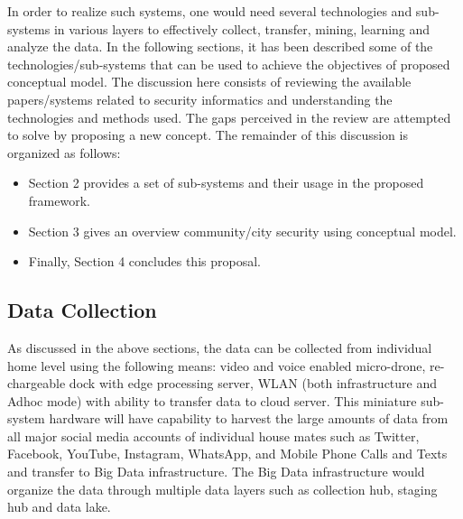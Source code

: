 \documentclass[sigconf]{acmart}
\begin{document}
In order to realize such systems, one would need several technologies and sub-systems in various layers to effectively collect, transfer, mining, learning and analyze the data. In the following sections, it has been described some of the technologies/sub-systems that can be used to achieve the objectives of proposed conceptual model.
The discussion here consists of reviewing the available papers/systems related to security informatics and understanding the technologies and methods used. The gaps perceived in the review are attempted to solve by proposing a new concept. The remainder of this discussion is organized as follows:
\begin{itemize}
  \item Section 2 provides a set of sub-systems and their usage in the proposed framework. 
  \item Section 3 gives an overview community/city security using conceptual model. 
  \item Finally, Section 4 concludes this proposal.
\end{itemize}

\subsection{Data Collection}
As discussed in the above sections, the data can be collected from individual home level using the following means: video and voice enabled micro-drone, re-chargeable dock with edge processing server, WLAN (both infrastructure and Adhoc mode) with ability to transfer data to cloud server. This miniature sub-system hardware will have capability to harvest the large amounts of data from all major social media accounts of individual house mates such as Twitter, Facebook, YouTube, Instagram, WhatsApp, and Mobile Phone Calls and Texts and transfer to Big Data infrastructure. The Big Data infrastructure would organize the data through multiple data layers such as collection hub, staging hub and data lake.
\end{document}
